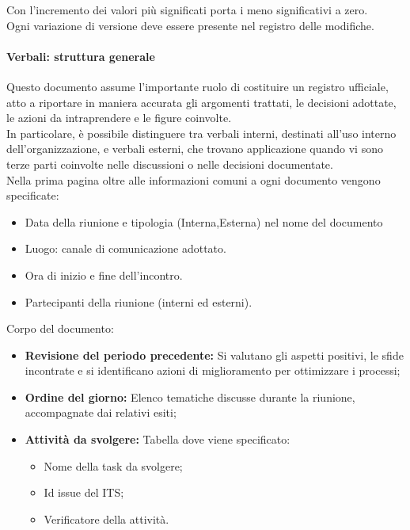 \documentclass{article}
\begin{document}
Con l'incremento dei valori più significati  porta i meno significativi a zero. \\
Ogni variazione di versione deve essere presente nel registro delle modifiche.

\paragraph{Verbali: struttura generale}
Questo documento assume l'importante ruolo di costituire un registro ufficiale, atto a riportare in maniera accurata gli argomenti trattati, le decisioni adottate, le azioni da intraprendere e le figure coinvolte.\\
In particolare, è possibile distinguere tra verbali interni, destinati all'uso interno dell'organizzazione, e verbali esterni, che trovano applicazione quando vi sono terze parti coinvolte nelle discussioni o nelle decisioni documentate.\\ 
Nella prima pagina oltre alle informazioni comuni a ogni documento vengono specificate:
\begin{itemize}
    \item Data della riunione e tipologia (Interna,Esterna) nel nome del documento
    \item Luogo: canale di comunicazione adottato.
    \item Ora di inizio e fine dell'incontro.
    \item Partecipanti della riunione (interni ed esterni).
\end{itemize}
Corpo del documento:

\begin{itemize}
    \item  \textbf{Revisione del periodo precedente:} Si valutano gli aspetti positivi, le sfide incontrate e si identificano azioni di miglioramento per ottimizzare i processi;
    \item  \textbf{Ordine del giorno:} Elenco tematiche discusse durante la riunione, accompagnate dai relativi esiti;
    \item  \textbf{Attività da svolgere:} Tabella dove viene specificato:
    \begin{itemize}
        \item Nome della task da svolgere;
        \item Id issue del ITS;
        \item Verificatore della attività.
    \end{itemize}

\end{itemize}
\end{document}
